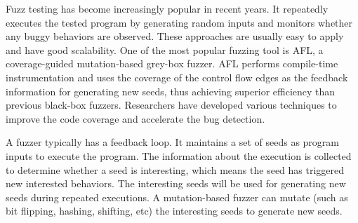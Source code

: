 Fuzz testing has become increasingly popular in recent years. It repeatedly executes the tested program by generating random inputs and monitors whether any buggy behaviors are observed. These approaches are usually easy to apply and have good scalability. One of the most popular fuzzing tool is AFL\cite{afl}, a coverage-guided mutation-based grey-box fuzzer. AFL performs compile-time instrumentation and uses the coverage of the control flow edges as the feedback information for generating new seeds, thus achieving superior efficiency than previous black-box fuzzers. Researchers have developed various techniques to improve the code coverage and accelerate the bug detection. 


A fuzzer typically has a feedback loop. It maintains a set of seeds as program inputs to execute the program. The information about the execution is collected to determine whether a seed is interesting, which means the seed has triggered new interested behaviors. The interesting seeds will be used for generating new seeds during repeated executions. A mutation-based fuzzer can mutate (such as bit flipping, hashing, shifting, etc) the interesting seeds to generate new seeds. 



